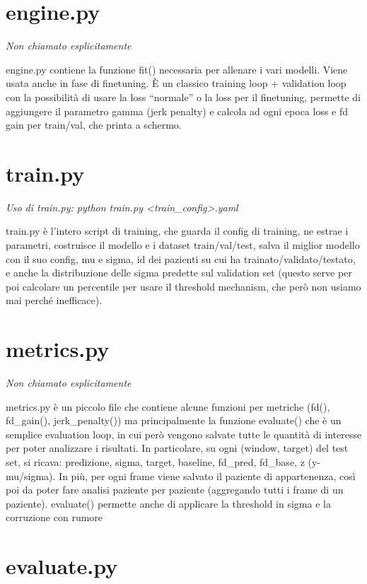 \documentclass[11pt]{article}
\newcommand{\nota}[1]{{\itshape\color{gray!60!black} #1}\par}
\begin{document}
\section{engine.py}

\nota{Non chiamato esplicitamente}

engine.py contiene la funzione fit() necessaria per allenare i vari modelli. Viene usata anche in fase di finetuning. È un classico training loop + validation loop con la possibilità di usare la loss ``normale'' o la loss per il finetuning, permette di aggiungere il parametro gamma (jerk penalty) e calcola ad ogni epoca loss e fd gain per train/val, che printa a schermo.

\section{train.py}

\nota{Uso di train.py: python train.py <train\_config>.yaml}

train.py è l'intero script di training, che guarda il config di training, ne estrae i parametri, costruisce il modello e i dataset train/val/test, salva il miglior modello con il suo config, mu e sigma, id dei pazienti su cui ha trainato/validato/testato, e anche la distribuzione delle sigma predette sul validation set (questo serve per poi calcolare un percentile per usare il threshold mechanism, che però non usiamo mai perché inefficace).

\section{metrics.py}

\nota{Non chiamato esplicitamente}

metrics.py è un piccolo file che contiene alcune funzioni per metriche (fd(), fd\_gain(), jerk\_penalty()) ma principalmente la funzione evaluate() che è un semplice evaluation loop, in cui però vengono salvate tutte le quantità di interesse per poter analizzare i risultati. In particolare, su ogni (window, target) del test set, si ricava: predizione, sigma, target, baseline, fd\_pred, fd\_base, z (y-mu/sigma). In più, per ogni frame viene salvato il paziente di appartenenza, così poi da poter fare analisi paziente per paziente (aggregando tutti i frame di un paziente). evaluate() permette anche di applicare la threshold in sigma e la corruzione con rumore

\section{evaluate.py}
\end{document}
